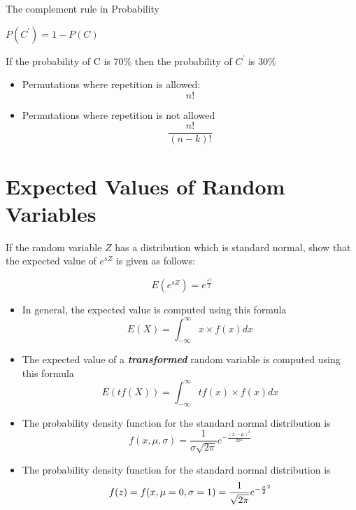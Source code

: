 \documentclass[12pt]{report}
\begin{document}
{{		%
		
		
		The complement rule in Probability
		
		$P(C^{\prime}) = 1- P(C)$
		
		
		
		If the probability of C is $70 \%$ then the probability of $C^{\prime}$ is $30\%$
		
		
		\newpage


\large
\begin{itemize}
	\item Permutations where repetition is allowed: 
	\[ n! \]
	\item Permutations where repetition is not allowed
	\[ \frac{n!}{(n-k)!} \]
	\end{itemize}
	
	
	
	

\section{Expected Values of Random Variables}

	
	

	\Large
	If the random variable $Z$ has a distribution which is standard normal, show that the expected value of $e^{sZ}$ is given as follows:
	
	{
		\LARGE
		\[E(e^{sZ})  =  e^{\frac{s^2}{2}}\] 
	}
	

	\Large
	\begin{itemize}
		\item In general, the expected value is computed using this formula
		{
			\LARGE
			\[ E(X) =  \int_{-\infty}^{\infty}  x \times f(x) dx   \]
		}
		\item The expected value of a \textbf{\textit{transformed}} random variable is computed using this formula
		{
			\LARGE
			\[ E( tf(X) ) =  \int_{-\infty}^{\infty}  tf(x) \times f(x) dx   \]
		}

		\item 
		The probability density function for the standard normal distribution is
		{
			\Large
			\[f(x, \mu, \sigma) = \frac{1}{\sigma\sqrt{2\pi}} e^{ -\frac{(x-\mu)^2}{2\sigma^2} }\]}
		\item 
		The probability density function for the standard normal distribution is
		{
			\Large
			\[f(z) = f(x, \mu= 0, \sigma=1) = \frac{1}{\sqrt{2\pi}} e^{ -{x \over 2}^2 }\]
		}
	\end{itemize}

}}
\end{document}
